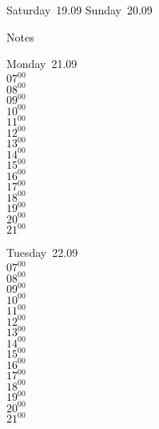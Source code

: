 \documentclass[11pt,a4paper]{book}\usepackage[]{graphicx}\usepackage[]{color}
\begin{document}
\begin{weekendbox}
  Saturday~19.09
  \tcblower
  Sunday~20.09
\end{weekendbox} %
\begin{notebox}
  Notes
\end{notebox}
\clearpage
\begin{headerbox}
\end{headerbox}
\begin{weekdaybox}
  Monday~21.09\\
  { 
  \vfill
  $07^{00}$\\
$08^{00}$\\
$09^{00}$\\
$10^{00}$\\
$11^{00}$\\
$12^{00}$\\
$13^{00}$\\
$14^{00}$\\
$15^{00}$\\
$16^{00}$\\
$17^{00}$\\
$18^{00}$\\
$19^{00}$\\
$20^{00}$\\
$21^{00}$\\
  }
\end{weekdaybox}
\begin{weekdaybox}
  Tuesday~22.09\\
  { 
  \vfill
  $07^{00}$\\
$08^{00}$\\
$09^{00}$\\
$10^{00}$\\
$11^{00}$\\
$12^{00}$\\
$13^{00}$\\
$14^{00}$\\
$15^{00}$\\
$16^{00}$\\
$17^{00}$\\
$18^{00}$\\
$19^{00}$\\
$20^{00}$\\
$21^{00}$\\
  }
\end{weekdaybox}
\end{document}
